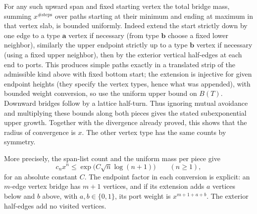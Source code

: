 For any such upward span and fixed starting vertex the total bridge mass, summing \(x^{\#\text{steps}}\) over paths starting at their minimum and ending at maximum in that vertex slab, is bounded uniformly. Indeed extend the start strictly down by one edge to a type \(\mathbf a\) vertex if necessary (from type \(\mathbf b\) choose a fixed lower neighbor), similarly the upper endpoint strictly up to a type \(\mathbf b\) vertex if necessary (using a fixed upper neighbor), then by the exterior vertical half-edges at each end to ports. This produces simple paths exactly in a translated strip of the admissible kind above with fixed bottom start; the extension is injective for given endpoint heights (they specify the vertex types, hence what was appended), with bounded weight conversion, so use the uniform upper bound on \(B(T)\). Downward bridges follow by a lattice half-turn. Thus ignoring mutual avoidance and multiplying these bounds along both pieces gives the stated subexponential upper growth. Together with the divergence already proved, this shows that the radius
of convergence is $x$.  The other vertex type has the same counts by
symmetry.

More precisely, the span-list count and the uniform mass per piece give
\begin{equation}
 c_nx^n\le \exp\!\bigl(C\sqrt n\log(n+1)\bigr)
 \qquad(n\ge1),                                      \label{c2:eq-unfolding}
\end{equation}
for an absolute constant $C$.  The endpoint factor in each conversion is
explicit: an $m$-edge vertex bridge has $m+1$ vertices, and if its extension
adds $a$ vertices below and $b$ above, with $a,b\in\{0,1\}$, its port weight
is $x^{m+1+a+b}$.  The exterior half-edges add no visited vertices.
